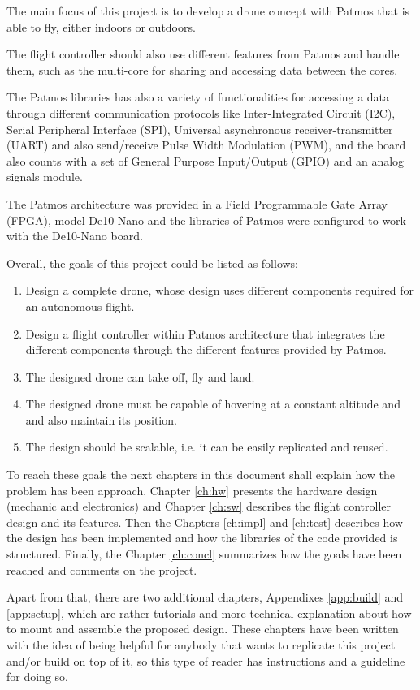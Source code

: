 The main focus of this project is to develop a drone concept with Patmos that is able to fly, either indoors or outdoors.

The flight controller should also use different features from Patmos and handle them, such as the multi-core for sharing and accessing data between the cores. 

The Patmos libraries has also a variety of functionalities for accessing a data through different communication protocols like Inter-Integrated Circuit (I2C), Serial Peripheral Interface (SPI), 
Universal asynchronous receiver-transmitter (UART) and also send/receive Pulse Width Modulation (PWM), and the board also counts with a set of General Purpose Input/Output (GPIO)  and an analog signals module. 

The Patmos architecture was provided in a Field Programmable Gate Array (FPGA), model De10-Nano and the libraries of Patmos were configured to work with the De10-Nano board. 


Overall, the goals of this project could be listed as follows:

\begin{enumerate}
    \item Design a complete drone, whose design uses different components required for an autonomous flight.
    \item Design a flight controller within Patmos architecture that integrates the different components through the different features provided by Patmos.
    \item The designed drone can take off, fly and land.
    \item The designed drone must be capable of hovering at a constant altitude and and also maintain its position.
    \item The design should be scalable, i.e. it can be easily replicated and reused.
\end{enumerate}

To reach these goals the next chapters in this document shall explain how the problem has been approach. Chapter \ref{ch:hw} presents the hardware design (mechanic and electronics) and Chapter \ref{ch:sw} describes the flight controller design and its features. Then the Chapters \ref{ch:impl} and \ref{ch:test} describes how the design has been implemented and how the libraries of the code provided is structured. Finally, the Chapter \ref{ch:concl} summarizes how the goals have been reached and comments on the project.

Apart from that, there are two additional chapters, Appendixes \ref{app:build} and \ref{app:setup}, which are rather tutorials and more technical explanation about how to mount and assemble the proposed design. These chapters have been written with the idea of being helpful for anybody that wants to replicate this project and/or build on top of it, so this type of reader has instructions and a guideline for doing so.